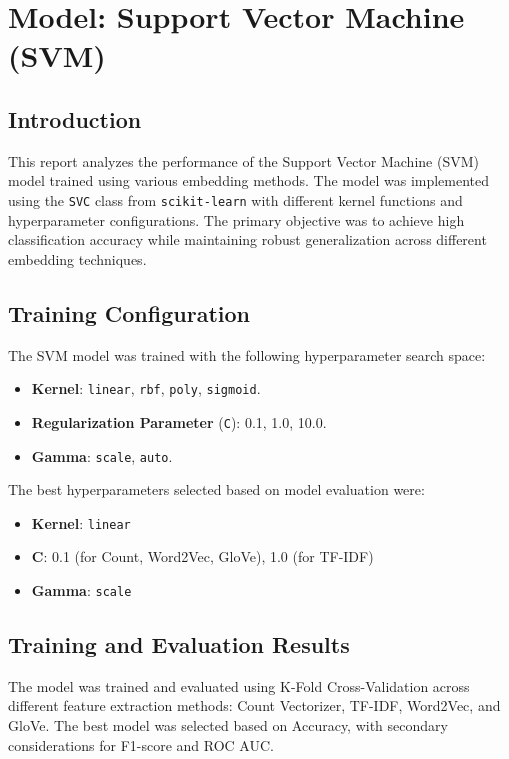 \section{Model: Support Vector Machine (SVM)}

\subsection{Introduction}
This report analyzes the performance of the Support Vector Machine (SVM) model trained using various embedding methods. The model was implemented using the \texttt{SVC} class from \texttt{scikit-learn} with different kernel functions and hyperparameter configurations. The primary objective was to achieve high classification accuracy while maintaining robust generalization across different embedding techniques.

\subsection{Training Configuration}
The SVM model was trained with the following hyperparameter search space:
\begin{itemize}
    \item \textbf{Kernel}: \texttt{linear}, \texttt{rbf}, \texttt{poly}, \texttt{sigmoid}.
    \item \textbf{Regularization Parameter} (\texttt{C}): 0.1, 1.0, 10.0.
    \item \textbf{Gamma}: \texttt{scale}, \texttt{auto}.
\end{itemize}

The best hyperparameters selected based on model evaluation were:
\begin{itemize}
    \item \textbf{Kernel}: \texttt{linear}
    \item \textbf{C}: 0.1 (for Count, Word2Vec, GloVe), 1.0 (for TF-IDF)
    \item \textbf{Gamma}: \texttt{scale}
\end{itemize}

\subsection{Training and Evaluation Results}
The model was trained and evaluated using K-Fold Cross-Validation across different feature extraction methods: Count Vectorizer, TF-IDF, Word2Vec, and GloVe. The best model was selected based on Accuracy, with secondary considerations for F1-score and ROC AUC.

